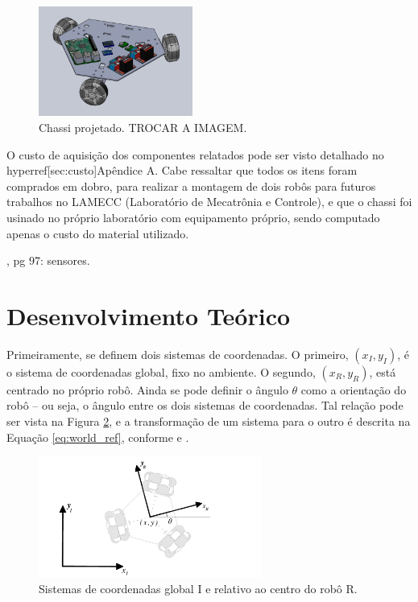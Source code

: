 \begin{figure}[h]
  \centering
  \includegraphics[width = 0.45\textwidth]{imagens/proto01}
  \caption{Chassi projetado. TROCAR A IMAGEM.}
  \label{fig:chassi}
\end{figure}

O custo de aquisição dos componentes relatados pode ser visto detalhado no hyperref[sec:custo]{Apêndice A}. Cabe ressaltar que todos os itens foram comprados em dobro, para realizar a montagem de dois robôs para futuros trabalhos no LAMECC (Laboratório de Mecatrônia e Controle), e que o chassi foi usinado no próprio laboratório com equipamento próprio, sendo computado apenas o custo do material utilizado.

\cite{siegwart2011introduction}, pg 97: sensores.

\section{Desenvolvimento Teórico}
\label{sec:teorico}


Primeiramente, se definem dois sistemas de coordenadas. O primeiro, $(x_I,y_I)$, é o sistema de coordenadas global, fixo no ambiente. O segundo, $(x_R,y_R)$, está centrado no próprio robô. Ainda se pode definir o ângulo $\theta$ como a orientação do robô -- ou seja, o ângulo entre os dois sistemas de coordenadas. Tal relação pode ser vista na Figura \ref{fig:ref}, e a transformação de um sistema para o outro é descrita na Equação \ref{eq:world_ref}, conforme \cite{siegwart2011introduction} e \cite{ritter2016modelagem}.

\begin{figure}[h]
  \centering
  \includegraphics[width = 0.65\textwidth]{imagens/ref}
  \caption{Sistemas de coordenadas global I e relativo ao centro do robô R.}
  \label{fig:ref}
\end{figure}

